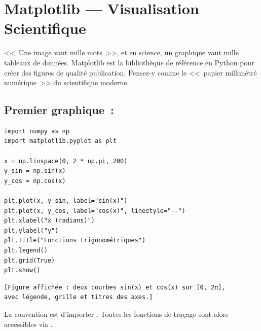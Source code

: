 \chapter{Matplotlib --- Visualisation Scientifique}
\label{ch:matplotlib}

\begin{intuition}
<<~Une image vaut mille mots~>>, et en science, un graphique vaut mille tableaux
de donn\'ees. Matplotlib est la biblioth\`eque de r\'ef\'erence en Python
pour cr\'eer des figures de qualit\'e publication. Pensez-y comme le
<<~papier millim\'etr\'e num\'erique~>> du scientifique moderne.
\end{intuition}

\section{Premier graphique~: }

\begin{codeblock}[title=\textbf{Python}]
\begin{verbatim}
import numpy as np
import matplotlib.pyplot as plt

x = np.linspace(0, 2 * np.pi, 200)
y_sin = np.sin(x)
y_cos = np.cos(x)

plt.plot(x, y_sin, label="sin(x)")
plt.plot(x, y_cos, label="cos(x)", linestyle="--")
plt.xlabel("x (radians)")
plt.ylabel("y")
plt.title("Fonctions trigonométriques")
plt.legend()
plt.grid(True)
plt.show()
\end{verbatim}
\end{codeblock}

\begin{codeoutput}
\begin{verbatim}
[Figure affichée : deux courbes sin(x) et cos(x) sur [0, 2π],
avec légende, grille et titres des axes.]
\end{verbatim}
\end{codeoutput}

\begin{remarque}
La convention est d'importer . Toutes les fonctions
de tra\c{c}age sont alors accessibles via .
\end{remarque}

